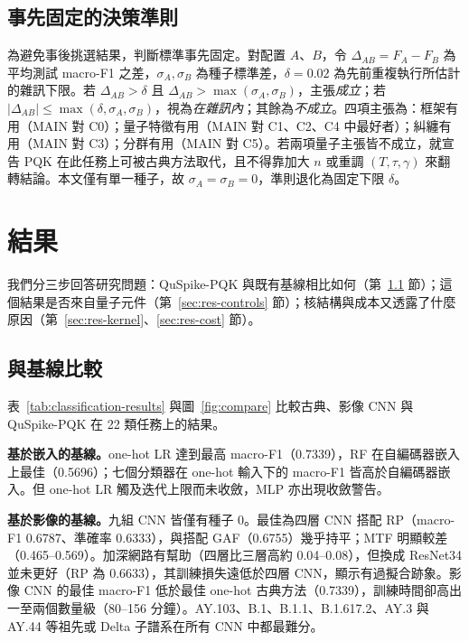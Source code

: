 \documentclass[10pt,a4paper]{article}
\begin{document}
\subsection{事先固定的決策準則}
\label{sec:criteria}

為避免事後挑選結果，判斷標準事先固定。對配置 $A$、$B$，令 $\Delta_{AB}=F_A-F_B$ 為平均測試 macro-F1 之差，$\sigma_A,\sigma_B$ 為種子標準差，$\delta=0.02$ 為先前重複執行所估計的雜訊下限。若 $\Delta_{AB}>\delta$ 且 $\Delta_{AB}>\max(\sigma_A,\sigma_B)$，主張\emph{成立}；若 $|\Delta_{AB}|\le\max(\delta,\sigma_A,\sigma_B)$，視為\emph{在雜訊內}；其餘為\emph{不成立}。四項主張為：框架有用（MAIN 對 C0）；量子特徵有用（MAIN 對 C1、C2、C4 中最好者）；糾纏有用（MAIN 對 C3）；分群有用（MAIN 對 C5）。若兩項量子主張皆不成立，就宣告 PQK 在此任務上可被古典方法取代，且不得靠加大 $n$ 或重調 $(T,\tau,\gamma)$ 來翻轉結論。本文僅有單一種子，故 $\sigma_A=\sigma_B=0$，準則退化為固定下限 $\delta$。

\FloatBarrier
\section{結果}
\label{sec:result}

我們分三步回答研究問題：QuSpike-PQK 與既有基線相比如何（第~\ref{sec:res-baselines} 節）；這個結果是否來自量子元件（第~\ref{sec:res-controls} 節）；核結構與成本又透露了什麼原因（第~\ref{sec:res-kernel}、\ref{sec:res-cost} 節）。

\subsection{與基線比較}
\label{sec:res-baselines}

表~\ref{tab:classification-results} 與圖~\ref{fig:compare} 比較古典、影像 CNN 與 QuSpike-PQK 在 22 類任務上的結果。

\textbf{基於嵌入的基線。}one-hot LR 達到最高 macro-F1（0.7339），RF 在自編碼器嵌入上最佳（0.5696）；七個分類器在 one-hot 輸入下的 macro-F1 皆高於自編碼器嵌入。但 one-hot LR 觸及迭代上限而未收斂，MLP 亦出現收斂警告。

\textbf{基於影像的基線。}九組 CNN 皆僅有種子 0。最佳為四層 CNN 搭配 RP（macro-F1 0.6787、準確率 0.6333），與搭配 GAF（0.6755）幾乎持平；MTF 明顯較差（0.465--0.569）。加深網路有幫助（四層比三層高約 0.04--0.08），但換成 ResNet34 並未更好（RP 為 0.6633），其訓練損失遠低於四層 CNN，顯示有過擬合跡象。影像 CNN 的最佳 macro-F1 低於最佳 one-hot 古典方法（0.7339），訓練時間卻高出一至兩個數量級（80--156 分鐘）。AY.103、B.1、B.1.1、B.1.617.2、AY.3 與 AY.44 等祖先或 Delta 子譜系在所有 CNN 中都最難分。
\end{document}
